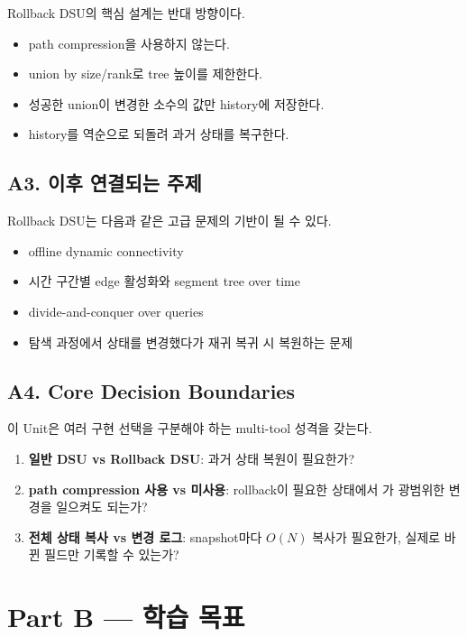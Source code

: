 Rollback DSU의 핵심 설계는 반대 방향이다.
\begin{itemize}
\item path compression을 사용하지 않는다.
\item union by size/rank로 tree 높이를 제한한다.
\item 성공한 union이 변경한 소수의 값만 history에 저장한다.
\item history를 역순으로 되돌려 과거 상태를 복구한다.
\end{itemize}

\subsection{A3. 이후 연결되는 주제}
Rollback DSU는 다음과 같은 고급 문제의 기반이 될 수 있다.
\begin{itemize}
\item offline dynamic connectivity
\item 시간 구간별 edge 활성화와 segment tree over time
\item divide-and-conquer over queries
\item 탐색 과정에서 상태를 변경했다가 재귀 복귀 시 복원하는 문제
\end{itemize}

\subsection{A4. Core Decision Boundaries}
이 Unit은 여러 구현 선택을 구분해야 하는 multi-tool 성격을 갖는다.
\begin{enumerate}
\item \textbf{일반 DSU vs Rollback DSU}: 과거 상태 복원이 필요한가?
\item \textbf{path compression 사용 vs 미사용}: rollback이 필요한 상태에서 가 광범위한 변경을 일으켜도 되는가?
\item \textbf{전체 상태 복사 vs 변경 로그}: snapshot마다 $O(N)$ 복사가 필요한가, 실제로 바뀐 필드만 기록할 수 있는가?
\end{enumerate}

\section{Part B --- 학습 목표}

